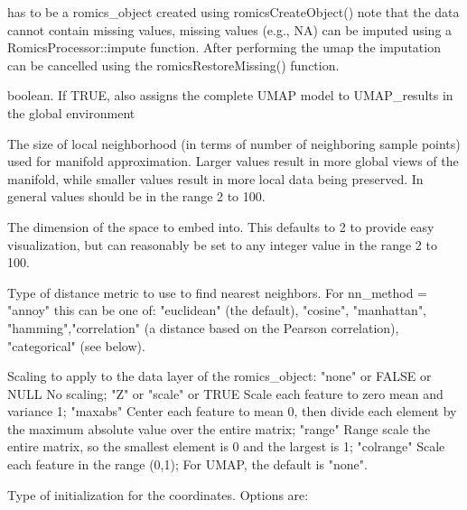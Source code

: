 \documentclass[a4paper]{book}
\begin{document}
\begin{Arguments}
\begin{ldescription}
\item[\code{romics\_object}] has to be a romics\_object created using romicsCreateObject() note that the data cannot contain missing values, missing values (e.g., NA) can be imputed using a RomicsProcessor::impute function. After performing the umap the imputation can be cancelled using the romicsRestoreMissing() function.

\item[\code{verbose}] boolean. If TRUE, also assigns the complete UMAP model to UMAP\_results in the global environment

\item[\code{n\_neighbors}] The size of local neighborhood (in terms of number of neighboring sample points) used for manifold approximation. Larger values result in more global views of the manifold, while smaller values result in more local data being preserved. In general values should be in the range 2 to 100.

\item[\code{n\_components}] The dimension of the space to embed into. This defaults to 2 to provide easy visualization, but can reasonably be set to any integer value in the range 2 to 100.

\item[\code{metric}] Type of distance metric to use to find nearest neighbors. For nn\_method = "annoy" this can be one of: "euclidean" (the default), "cosine", "manhattan", "hamming","correlation" (a distance based on the Pearson correlation), "categorical" (see below).

\item[\code{standardize}] Scaling to apply to the data layer of the romics\_object: "none" or FALSE or NULL No scaling; "Z" or "scale" or TRUE Scale each feature to zero mean and variance 1; "maxabs" Center each feature to mean 0, then divide each element by the maximum absolute value over the entire matrix; "range" Range scale the entire matrix, so the smallest element is 0 and the largest is 1; "colrange" Scale each feature in the range (0,1); For UMAP, the default is "none".

\item[\code{init}] Type of initialization for the coordinates. Options are:
\begin{itemize}


\end{itemize}
\end{ldescription}
\end{Arguments}
\end{document}
